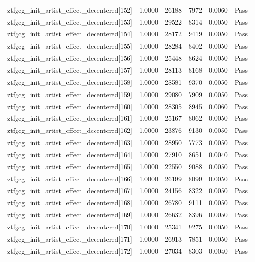 \begin{table}[htbp]
\begin{tabular}{llrrll}
ztfgcg\_init\_artist\_effect\_decentered[152] & 1.0000 & 26188 & 7972 & 0.0060 & Pass \\
ztfgcg\_init\_artist\_effect\_decentered[153] & 1.0000 & 29522 & 8314 & 0.0050 & Pass \\
ztfgcg\_init\_artist\_effect\_decentered[154] & 1.0000 & 28172 & 9419 & 0.0050 & Pass \\
ztfgcg\_init\_artist\_effect\_decentered[155] & 1.0000 & 28284 & 8402 & 0.0050 & Pass \\
ztfgcg\_init\_artist\_effect\_decentered[156] & 1.0000 & 25448 & 8624 & 0.0050 & Pass \\
ztfgcg\_init\_artist\_effect\_decentered[157] & 1.0000 & 28113 & 8168 & 0.0050 & Pass \\
ztfgcg\_init\_artist\_effect\_decentered[158] & 1.0000 & 28581 & 9370 & 0.0050 & Pass \\
ztfgcg\_init\_artist\_effect\_decentered[159] & 1.0000 & 29080 & 7909 & 0.0050 & Pass \\
ztfgcg\_init\_artist\_effect\_decentered[160] & 1.0000 & 28305 & 8945 & 0.0060 & Pass \\
ztfgcg\_init\_artist\_effect\_decentered[161] & 1.0000 & 25167 & 8062 & 0.0050 & Pass \\
ztfgcg\_init\_artist\_effect\_decentered[162] & 1.0000 & 23876 & 9130 & 0.0050 & Pass \\
ztfgcg\_init\_artist\_effect\_decentered[163] & 1.0000 & 28950 & 7773 & 0.0050 & Pass \\
ztfgcg\_init\_artist\_effect\_decentered[164] & 1.0000 & 27910 & 8651 & 0.0040 & Pass \\
ztfgcg\_init\_artist\_effect\_decentered[165] & 1.0000 & 22550 & 9088 & 0.0050 & Pass \\
ztfgcg\_init\_artist\_effect\_decentered[166] & 1.0000 & 26199 & 8099 & 0.0050 & Pass \\
ztfgcg\_init\_artist\_effect\_decentered[167] & 1.0000 & 24156 & 8322 & 0.0050 & Pass \\
ztfgcg\_init\_artist\_effect\_decentered[168] & 1.0000 & 26780 & 9111 & 0.0050 & Pass \\
ztfgcg\_init\_artist\_effect\_decentered[169] & 1.0000 & 26632 & 8396 & 0.0050 & Pass \\
ztfgcg\_init\_artist\_effect\_decentered[170] & 1.0000 & 25341 & 9275 & 0.0050 & Pass \\
ztfgcg\_init\_artist\_effect\_decentered[171] & 1.0000 & 26913 & 7851 & 0.0050 & Pass \\
ztfgcg\_init\_artist\_effect\_decentered[172] & 1.0000 & 27034 & 8303 & 0.0040 & Pass \\

\end{tabular}
\end{table}
